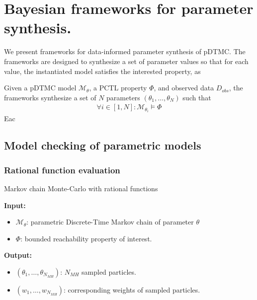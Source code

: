 \chapter{Bayesian frameworks for parameter synthesis.}
We present frameworks for data-informed parameter synthesis of pDTMC. The frameworks are designed to
synthesize a set of parameter values so that for each value, the instantiated model satisfies the interested property, as

Given a pDTMC model $\mathcal{M}_\theta$, a PCTL property $\Phi$, and observed data $D_{obs}$, the
frameworks synthesize a set of $N$ parameters $(\theta_1,\ldots,\theta_N)$ such that
\begin{align*}
    \forall i \in [1,N]: \mathcal{M}_{\theta_i} \models \Phi
\end{align*}
Eac

\section{Model checking of parametric models}
\subsection{Rational function evaluation}
\begin{algorithm}[H]
    \caption{Markov chain Monte-Carlo with rational functions}
    \label{rf-mcmc-alg}
    \hspace*{\algorithmicindent} \textbf{Input:}
    \begin{itemize}
        \item $\mathcal{M}_\theta$: parametric Discrete-Time Markov chain of parameter $\theta$
        \item $\Phi$: bounded reachability property of interest.
    \end{itemize}
    \hspace*{\algorithmicindent} \textbf{Output:}
    \begin{itemize}
        \item $(\theta_1,\ldots,\theta_{N_{MH}})$: $N_{MH}$ sampled particles.
        \item $(w_1,\ldots,w_{N_{MH}})$: corresponding weights of sampled particles.
    \end{itemize}
    \begin{algorithmic}[1]

        \EndProcedure
    \end{algorithmic}
\end{algorithm}


